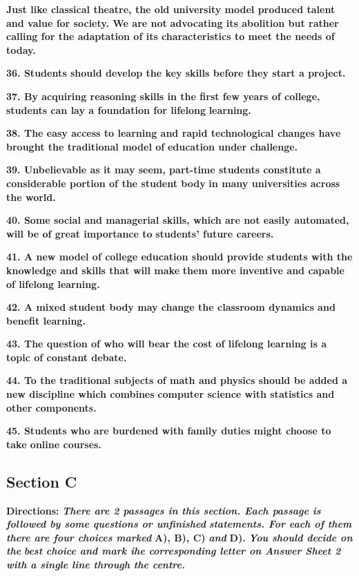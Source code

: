 \documentclass[UTF8,11pt]{ctexart}
\begin{document}
\textbf{Just like classical theatre, the old university model produced talent and value for society. We are not} \textbf{advocating its abolition but rather calling for the adaptation of its characteristics to meet the needs of} \textbf{today.}


\textbf{36. Students should develop the key skills before they start a project.}


\textbf{37. By acquiring reasoning skills in the first few years of college, students can lay a foundation for lifelong} \textbf{learning.}


\textbf{38. The easy access to learning and rapid technological changes have brought the traditional model of} \textbf{education under challenge.}


\textbf{39. Unbelievable as it may seem, part-time students constitute a considerable portion of the student body} \textbf{in many universities across the world.}


\textbf{40. Some social and managerial skills, which are not easily automated, will be of great importance to} \textbf{students' future careers.}


\textbf{41. A new model of college education should provide students with the knowledge and skills that will make} \textbf{them more inventive and capable of lifelong learning.}


\textbf{42. A mixed student body may change the classroom dynamics and benefit learning.}


\textbf{43. The question of who will bear the cost of lifelong learning is a topic of constant debate.}


\textbf{44. To the traditional subjects of math and physics should be added a new discipline which combines} \textbf{computer science with statistics and other components.}


\textbf{45. Students who are burdened with family duties might choose to take online courses.}


\subsection*{\textbf{Section C}}


\textbf{Directions: }\textbf{\textit{There are 2 passages in this section. Each passage is followed by some questions or unfinished}} \textbf{\textit{statements. For each of them there are four choices marked }}\textbf{A), B), C) }\textbf{\textit{and }}\textbf{D). }\textbf{\textit{You should decide on the}} \textbf{\textit{best choice and mark ihe corresponding letter on Answer Sheet 2 with a single line through the centre.}}
\end{document}
